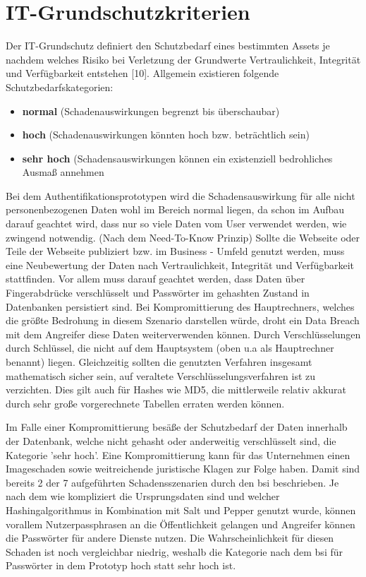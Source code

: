 \section{IT-Grundschutzkriterien}
Der IT-Grundschutz definiert den Schutzbedarf eines bestimmten Assets je nachdem welches Risiko bei Verletzung der Grundwerte Vertraulichkeit, Integrität und Verfügbarkeit entstehen [10]. Allgemein existieren folgende Schutzbedarfskategorien:
\begin{itemize} 
\item \textbf{normal} (Schadenauswirkungen begrenzt bis überschaubar)
\item \textbf{hoch} (Schadenauswirkungen könnten hoch bzw. beträchtlich sein)
\item \textbf{sehr hoch} (Schadensauswirkungen können ein existenziell bedrohliches Ausmaß annehmen
\end{itemize}
Bei dem Authentifikationsprototypen wird die Schadensauswirkung für alle nicht personenbezogenen Daten wohl im Bereich normal liegen, da schon im Aufbau darauf geachtet wird, dass nur so viele Daten vom User verwendet werden, wie zwingend notwendig. (Nach dem Need-To-Know Prinzip) Sollte die Webseite oder Teile der Webseite publiziert bzw. im Business - Umfeld genutzt werden, muss eine Neubewertung der Daten nach Vertraulichkeit, Integrität und Verfügbarkeit stattfinden. Vor allem muss darauf geachtet werden, dass Daten über Fingerabdrücke verschlüsselt und Passwörter im gehashten Zustand in Datenbanken persistiert sind. Bei Kompromittierung des Hauptrechners, welches die größte Bedrohung in diesem Szenario darstellen würde, droht ein Data Breach mit dem Angreifer diese Daten weiterverwenden können. Durch Verschlüsselungen durch Schlüssel, die nicht auf dem Hauptsystem (oben u.a als Hauptrechner benannt) liegen. Gleichzeitig sollten die genutzten Verfahren insgesamt mathematisch sicher sein, auf veraltete Verschlüsselungsverfahren ist zu verzichten. Dies gilt auch für Hashes wie MD5, die mittlerweile relativ akkurat durch sehr große vorgerechnete Tabellen erraten werden können.

Im Falle einer Kompromittierung besäße der Schutzbedarf der Daten innerhalb der Datenbank, welche nicht gehasht oder anderweitig verschlüsselt sind, die Kategorie 'sehr hoch'. Eine Kompromittierung kann für das Unternehmen einen Imageschaden sowie weitreichende juristische Klagen zur Folge haben. Damit sind bereits 2 der 7 aufgeführten Schadensszenarien durch den \ac{bsi} beschrieben. Je nach dem wie kompliziert die Ursprungsdaten sind und welcher Hashingalgorithmus in Kombination mit Salt und Pepper genutzt wurde, können vorallem Nutzerpassphrasen an die Öffentlichkeit gelangen und Angreifer können die Passwörter für andere Dienste nutzen. Die Wahrscheinlichkeit für diesen Schaden ist noch vergleichbar niedrig, weshalb die Kategorie nach dem \ac{bsi} für Passwörter in dem Prototyp hoch statt sehr hoch ist.
\newpage

